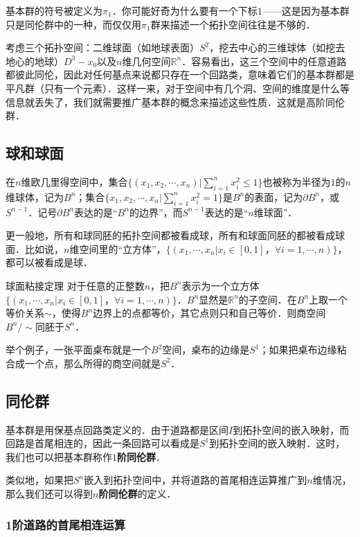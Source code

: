 

基本群的符号被定义为$\pi_1$．你可能好奇为什么要有一个下标$1$——这是因为基本群只是同伦群中的一种，而仅仅用$\pi_1$群来描述一个拓扑空间往往是不够的．

考虑三个拓扑空间：二维球面（如地球表面）$S^2$，挖去中心的三维球体（如挖去地心的地球）$D^3-x_0$以及$n$维几何空间$\mathbb{R}^n$．容易看出，这三个空间中的任意道路都彼此同伦，因此对任何基点来说都只存在一个回路类，意味着它们的基本群都是平凡群（只有一个元素）．这样一来，对于空间中有几个洞、空间的维度是什么等信息就丢失了，我们就需要推广基本群的概念来描述这些性质．这就是高阶同伦群．

\subsection{球和球面}
在$n$维欧几里得空间中，集合$\{(x_1, x_2,\cdots,x_n)|\sum^n_{i=1}x_i^2\leq 1\}$也被称为半径为$1$的$n$维球体，记为$B^n$；集合$\{x_1, x_2, \cdots, x_n|\sum^n_{i=1}x_i^2=1\}$是$B^n$的表面，记为$\partial B^n$，或$S^{n-1}$．记号$\partial B^n$表达的是“$B^n$的边界”，而$S^{n-1}$表达的是“$n$维球面”．

更一般地，所有和球同胚的拓扑空间都被看成球，所有和球面同胚的都被看成球面．比如说，$n$维空间里的“立方体”，$\{(x_1, \cdots, x_n|x_i\in[0, 1]，\forall i=1, \cdots, n)\}$，都可以被看成是球．

\begin{theorem}{球面粘接定理}
对于任意的正整数$n$，把$B^n$表示为一个立方体$\{(x_1, \cdots, x_n|x_i\in[0, 1]，\forall i=1, \cdots, n)\}$．$B^n$显然是$\mathbb{R}^n$的子空间．在$B^n$上取一个等价关系$\sim$，使得$B^n$边界上的点都等价，其它点则只和自己等价．则商空间$B^n/\sim$同胚于$S^n$．
\end{theorem}

举个例子，一张平面桌布就是一个$B^2$空间，桌布的边缘是$S^1$；如果把桌布边缘粘合成一个点，那么所得的商空间就是$S^2$．

\subsection{同伦群}

基本群是用保基点回路类定义的．由于道路都是区间$I$到拓扑空间的嵌入映射，而回路是首尾相连的，因此一条回路可以看成是$S^1$到拓扑空间的嵌入映射．这时，我们也可以把基本群称作$1$\textbf{阶同伦群}．

类似地，如果把$S^n$嵌入到拓扑空间中，并将道路的首尾相连运算推广到$n$维情况，那么我们还可以得到$n$\textbf{阶同伦群}的定义．

\subsubsection{1阶道路的首尾相连运算}



